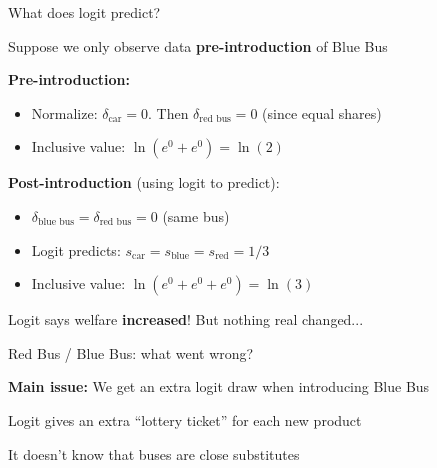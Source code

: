 \documentclass[notes,11pt, aspectratio=169]{beamer}
\newenvironment{wideitemize}{\itemize\addtolength{\itemsep}{10pt}}{\enditemize}
\begin{document}
\begin{frame}{What does logit predict?}
	\begin{wideitemize}
		\item Suppose we only observe data \textbf{pre-introduction} of Blue Bus
		\item \textbf{Pre-introduction:}
		\begin{itemize}
			\item Normalize: $\delta_{\text{car}} = 0$. Then $\delta_{\text{red bus}} = 0$ (since equal shares)
			\item Inclusive value: $\ln(e^0 + e^0) = \ln(2)$
		\end{itemize}
		\item \textbf{Post-introduction} (using logit to predict):
		\begin{itemize}
			\item $\delta_{\text{blue bus}} = \delta_{\text{red bus}} = 0$ (same bus)
			\item Logit predicts: $s_{\text{car}} = s_{\text{blue}} = s_{\text{red}} = 1/3$
			\item Inclusive value: $\ln(e^0 + e^0 + e^0) = \ln(3)$
		\end{itemize}
		\item Logit says welfare \textbf{increased}! But nothing real changed...
	\end{wideitemize}
\end{frame}

\begin{frame}{Red Bus / Blue Bus: what went wrong?}
	\begin{wideitemize}
		\item \textbf{Main issue:} We get an extra logit draw when introducing Blue Bus
		\item Logit gives an extra ``lottery ticket'' for each new product
		\item It doesn't know that buses are close substitutes
	\end{wideitemize}
\end{frame}
\end{document}

